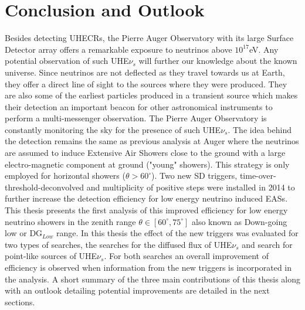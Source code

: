 
\chapter{Conclusion and Outlook}
\label{chap:conc}

Besides detecting \glspl{UHECR}, the Pierre Auger Observatory with its large Surface Detector array offers a remarkable exposure to neutrinos above $10^{17}$eV. Any potential observation of such UHE$\nu_s$ will further our knowledge about the known universe. Since neutrinos are not deflected as they travel towards us at Earth, they offer a direct line of sight to the sources where they were produced. They are also some of the earliest particles produced in a transient source which makes their detection an important beacon for other astronomical instruments to perform a multi-messenger observation. The Pierre Auger Observatory is constantly monitoring the sky for the presence of such UHE$\nu_s$. The idea behind the detection remains the same as previous analysis at Auger where the neutrinos are assumed to induce Extensive Air Showers close to the ground with a large electro-magnetic component at ground ("young" showers). This strategy is only employed for horizontal showers ($\theta > 60^{\circ}$). Two new SD triggers, time-over-threshold-deconvolved and multiplicity of positive steps were installed in 2014 to further increase the detection efficiency for low energy neutrino induced EASs. This thesis presents the first analysis of this improved efficiency for low energy neutrino showers in the zenith range $\theta \in [60^{\circ},75^\circ]$ also known as Down-going low or DG$_{Low}$ range. In this thesis the effect of the new triggers was evaluated for two types of searches, the searches for the diffused flux of UHE$\nu_s$ and search for point-like sources of UHE$\nu_s$. For both searches an overall improvement of efficiency is observed when information from the new triggers is incorporated in the analysis. A short summary of the three main contributions of this thesis along with an outlook detailing potential improvements are detailed in the next sections. 
